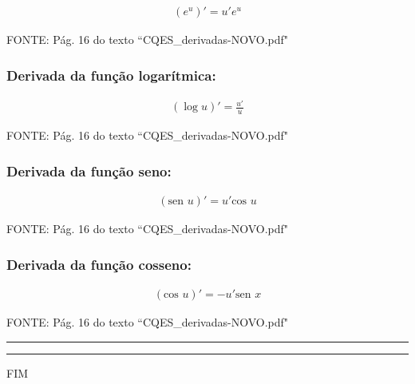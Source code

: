 \documentclass[portuguese,a4paper,12pt,onecolumn,fleqn]{article}
\newcommand{\myline}{\par
  \kern3pt %
  \hrule height 1.5pt
  \kern2pt %
  \hrule height 0.8pt
  \kern3pt %
}
\begin{document}
\begin{gather*}
(e^u)' = u' e^u
\end{gather*}

FONTE: Pág. 16 do texto ``CQES\_derivadas-NOVO.pdf"


\subsubsection*{Derivada da função logarítmica:}

\begin{gather*}
(\log u)' = \frac{u'}{u}
\end{gather*}

FONTE: Pág. 16 do texto ``CQES\_derivadas-NOVO.pdf"


\subsubsection*{Derivada da função seno:}

\begin{gather*}
(\textrm{sen } u)' = u' \textrm{cos } u
\end{gather*}

FONTE: Pág. 16 do texto ``CQES\_derivadas-NOVO.pdf"


\subsubsection*{Derivada da função cosseno:}

\begin{gather*}
(\textrm{cos } u)' = -u' \textrm{sen } x
\end{gather*}

FONTE: Pág. 16 do texto ``CQES\_derivadas-NOVO.pdf"

\myline	%


\begin{center}
FIM
\end{center}
\end{document}
